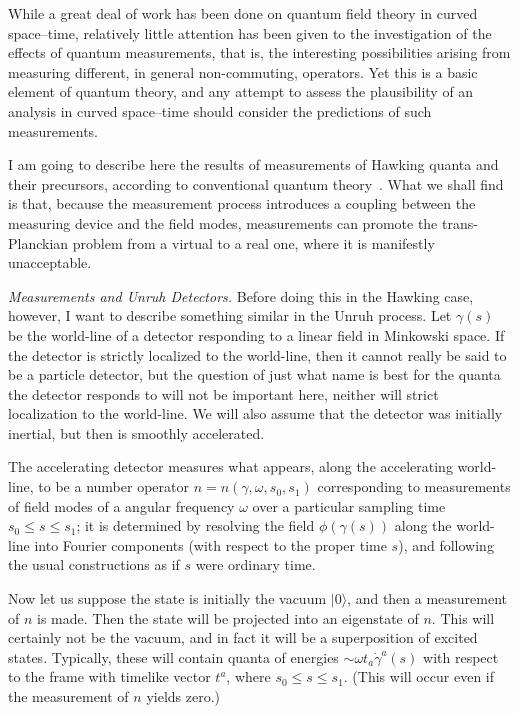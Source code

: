 \documentclass[12pt]{article}
\begin{document}
While a great deal of work has been done on quantum field theory in curved space--time, relatively little attention has been given to the investigation of the effects of quantum measurements, that is, the interesting possibilities arising from measuring different, in general non-commuting, operators.  Yet this is a basic element of quantum theory, and any attempt to assess the plausibility of an analysis in curved space--time should consider the predictions of such measurements.

I am going to describe here the results of measurements of Hawking quanta and their precursors, according to conventional quantum theory~\citep{Helfer:2004jx}.  What we shall find is that, because the measurement process introduces a coupling between the measuring device and the field modes, measurements can promote the trans-Planckian problem from a virtual to a real one, where it is manifestly unacceptable.

{\em Measurements and Unruh Detectors.}
Before doing this in the Hawking case, however, I want to describe something similar in the Unruh process.  Let $\gamma (s)$ be the world-line of a detector responding to a linear field in Minkowski space.  If the detector is strictly localized to the world-line, then it cannot really be said to be a particle detector, but the question of just what name is best for the quanta the detector responds to will not be important here, neither will strict localization to the world-line.  We will also assume that the detector was initially inertial, but then is smoothly accelerated.

The accelerating detector measures what appears, along  the accelerating world-line, to be a number operator $n=n(\gamma ,\omega , s_0,s_1)$ corresponding to measurements of field modes of a angular frequency $\omega$ over a particular sampling time $s_0\leq s\leq s_1$; it is determined by 
resolving the field $\phi (\gamma (s))$ along the world-line into Fourier components (with respect to the proper time $s$), and following the usual constructions as if $s$ were ordinary time.  

Now let us suppose the state is initially the vacuum $|0\rangle$, and then a measurement of $n$ is made.  Then the state will be projected into an eigenstate of $n$.  This will certainly not be the vacuum, and in fact it will be a superposition of excited states.  Typically, these will contain quanta of energies $\sim \omega t_a\dot\gamma ^a(s)$ with respect to the frame with timelike vector $t^a$, where $s_0\leq s\leq s_1$.  (This will occur even if the measurement of $n$ yields zero.)
\end{document}
